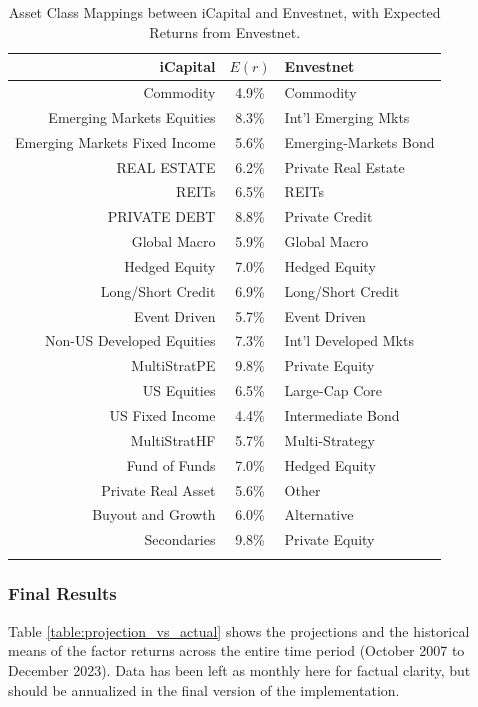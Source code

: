 \documentclass{ledger}
\begin{document}
\begin{table}[ht]
\footnotesize
\centering
\caption{Asset Class Mappings between iCapital and Envestnet, with Expected Returns from Envestnet. \label{tab:asset_class_mapping}}
\begin{tabular}{rcl}
	\toprule
		\textbf{iCapital} & \textbf{$E(r)$} & \textbf{Envestnet} \\
	\midrule
		Commodity & 4.9\% & Commodity \\
		Emerging Markets Equities & 8.3\% & Int'l Emerging Mkts \\
		Emerging Markets Fixed Income & 5.6\% & Emerging-Markets Bond \\
		REAL ESTATE & 6.2\% & Private Real Estate \\
		REITs & 6.5\% & REITs \\
		PRIVATE DEBT & 8.8\% & Private Credit \\
		Global Macro & 5.9\% & Global Macro \\
		Hedged Equity & 7.0\% & Hedged Equity \\
		Long/Short Credit & 6.9\% & Long/Short Credit \\
		Event Driven & 5.7\% & Event Driven \\
		Non-US Developed Equities & 7.3\% & Int'l Developed Mkts \\
		MultiStratPE & 9.8\% & Private Equity \\
		US Equities & 6.5\% & Large-Cap Core \\
		US Fixed Income & 4.4\% & Intermediate Bond \\
		MultiStratHF & 5.7\% & Multi-Strategy \\
		Fund of Funds & 7.0\% & Hedged Equity \\
		Private Real Asset & 5.6\% & Other \\
		Buyout and Growth & 6.0\% & Alternative \\
		Secondaries & 9.8\% & Private Equity \\
	\bottomrule \\
\end{tabular}
\end{table}




\subsubsection{Final Results}
Table \ref{table:projection_vs_actual} shows the projections and the historical means of the factor returns across the entire time period (October  2007 to December 2023). Data has been left as monthly here for factual clarity, but should be annualized in the final version of the implementation. \\
\end{document}
